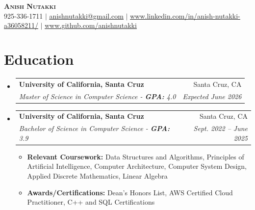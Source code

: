 \documentclass[letterpaper,11pt]{article}
\makeatletter
\newcommand{\resumeItem}[1]{
  \item\small{
    {#1 \vspace{-2pt}}
  }
}
\newcommand{\resumeSubheading}[4]{
  \vspace{-2pt}\item
    \begin{tabular*}{0.97\textwidth}[t]{l@{\extracolsep{\fill}}r}
      \textbf{#1} & #2 \\
      \textit{\small#3} & \textit{\small #4} \\
    \end{tabular*}\vspace{-7pt}
}
\newcommand{\resumeSubHeadingListStart}{\begin{itemize}[leftmargin=0.15in, label={}]}
\newcommand{\resumeSubHeadingListEnd}{\end{itemize}}
\newcommand{\resumeItemListStart}{\begin{itemize}}
\newcommand{\resumeItemListEnd}{\end{itemize}\vspace{-5pt}}
\makeatother
\begin{document}

\begin{center}
    \textbf{\Huge \scshape Anish Nutakki} \\ \vspace{1pt}
    \small 925-336-1711 $|$ \href{mailto:x@x.com}{\underline{anishnutakki@gmail.com}} $|$ 
    \href{https://linkedin.com/in/...}{\underline{www.linkedin.com/in/anish-nutakki-a36058211/}} $|$
    \href{https://github.com/...}{\underline{www.github.com/anishnutakki}}
\end{center}


\section{Education}
  \resumeSubHeadingListStart
    \resumeSubheading
      {University of California, Santa Cruz}{Santa Cruz, CA}
      {Master of Science in Computer Science - \textbf{GPA:} 4.0}{Expected June 2026}
    \resumeSubheading
      {University of California, Santa Cruz}{Santa Cruz, CA}
      {Bachelor of Science in Computer Science - \textbf{GPA:} 3.9}{Sept. 2022 -- June 2025}
      \resumeItemListStart
        \resumeItem{}
          {\textbf{Relevant Coursework:} Data Structures and Algorithms, Principles of Artificial Intelligence, Computer Architecture, Computer System Design, Applied Discrete Mathematics, Linear Algebra}
        \resumeItem{}
          {\textbf{Awards/Certifications:} Dean's Honors List, AWS Certified Cloud Practitioner, C++ and SQL Certifications  }
      \resumeItemListEnd
  \resumeSubHeadingListEnd

\end{document}
